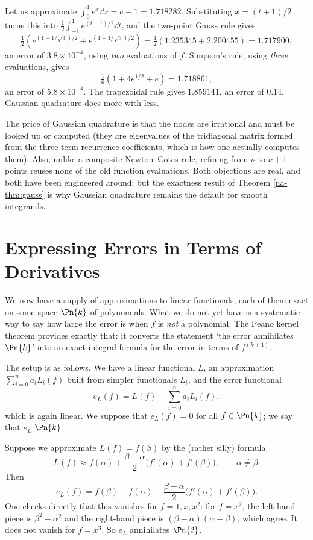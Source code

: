 \begin{example}
  Let us approximate $\int_0^1 e^x \dd x = e - 1 = 1.718282$. Substituting $x = (t+1)/2$ turns this into $\tfrac12\int_{-1}^1 e^{(t+1)/2}\dd t$, and the two-point Gauss rule gives
  $$
  \tfrac12\left(e^{(1 - 1/\sqrt3)/2} + e^{(1+1/\sqrt3)/2}\right) = \tfrac12(1.235345 + 2.200455) = 1.717900,
  $$
  an error of $3.8 \times 10^{-4}$, using \emph{two} evaluations of $f$. Simpson's rule, using \emph{three} evaluations, gives
  $$
  \tfrac16\left(1 + 4e^{1/2} + e\right) = 1.718861,
  $$
  an error of $5.8\times 10^{-4}$. The trapezoidal rule gives $1.859141$, an error of $0.14$. Gaussian quadrature does more with less.
\end{example}

\begin{remark}
  The price of Gaussian quadrature is that the nodes are irrational and must be looked up or computed (they are eigenvalues of the tridiagonal matrix formed from the three-term recurrence coefficients, which is how one actually computes them). Also, unlike a composite Newton--Cotes rule, refining from $\nu$ to $\nu+1$ points reuses none of the old function evaluations. Both objections are real, and both have been engineered around; but the exactness result of Theorem \ref{na-thm:gauss} is why Gaussian quadrature remains the default for smooth integrands.
\end{remark}


\section{Expressing Errors in Terms of Derivatives}

We now have a supply of approximations to linear functionals, each of them exact on some space $\Pn{k}$ of polynomials. What we do not yet have is a systematic way to say how large the error is when $f$ is \emph{not} a polynomial. The Peano kernel theorem provides exactly that: it converts the statement `the error annihilates $\Pn{k}$' into an exact integral formula for the error in terms of $f^{(k+1)}$.

The setup is as follows. We have a linear functional $L$, an approximation $\sum_{i=0}^n a_i L_i(f)$ built from simpler functionals $L_i$, and the error functional
$$
e_L(f) = L(f) - \sum_{i=0}^{n}a_i L_i(f),
$$
which is again linear. We suppose that $e_L(f) = 0$ for all $f \in \Pn{k}$; we say that $e_L$  $\Pn{k}$.

\begin{example}
  Suppose we approximate $L(f) = f(\beta)$ by the (rather silly) formula
  $$
  L(f) \approx f(\alpha) + \frac{\beta - \alpha}{2}\big(f'(\alpha) + f'(\beta)\big), \qquad \alpha \neq \beta.
  $$
  Then
  $$
  e_L(f) = f(\beta) - f(\alpha) - \frac{\beta-\alpha}{2}\big(f'(\alpha) + f'(\beta)\big).
  $$
  One checks directly that this vanishes for $f = 1, x, x^2$: for $f = x^2$, the left-hand piece is $\beta^2 - \alpha^2$ and the right-hand piece is $(\beta-\alpha)(\alpha+\beta)$, which agree. It does not vanish for $f = x^3$. So $e_L$ annihilates $\Pn{2}$.
\end{example}

